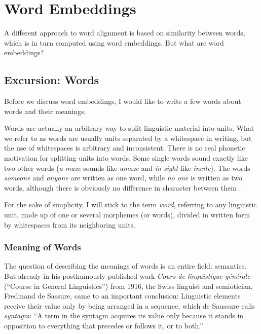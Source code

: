 


\section{Word Embeddings}
\label{sec:word-embeddings}
A different approach to word alignment is based on similarity between words, which is in turn computed using word embeddings. 
But what are word embeddings?
 

\subsection{Excursion: Words}
Before we discuss word embeddings, I would like to write a few words about words and their meanings.

Words are actually an arbitrary way to split linguistic material into units. 
What we refer to as words are usually units separated by a whitespace in writing, but the use of whitespaces is arbitrary and inconsistent. 
There is no real phonetic motivation for splitting units into words. 
Some single words sound exactly like two other words (\emph{a maze} sounds like \emph{amaze} and \emph{in sight} like \emph{incite}). 
The words \emph{someone} and \emph{anyone} are written as one word, while \emph{no one} is written as two words, although there is obviously no difference in character between them \autocite[92-95]{Jespersen1924}.

For the sake of simplicity, I will stick to the term \emph{word}, referring to any linguistic unit, made up of one or several morphemes (or words), divided in written form by whitespaces from its neighboring units.

\subsubsection{Meaning of Words}
The question of describing the meanings of words is an entire field: semantics. But already in his posthumously published work \emph{Cours de linguistique générale} (\enquote{Course in General Linguistics}) from 1916, the Swiss linguist and semiotician, Fredinand de Sassure, came to an important conclusion: 
Linguistic elements receive their value only by being arranged in a sequence, which de Saussure calls \emph{syntagm}: 
\enquote{A term in the syntagm acquires its value only because it stands in opposition to everything that precedes or follows it, or to both.} \autocite[123]{de-saussure-1959-course} 

